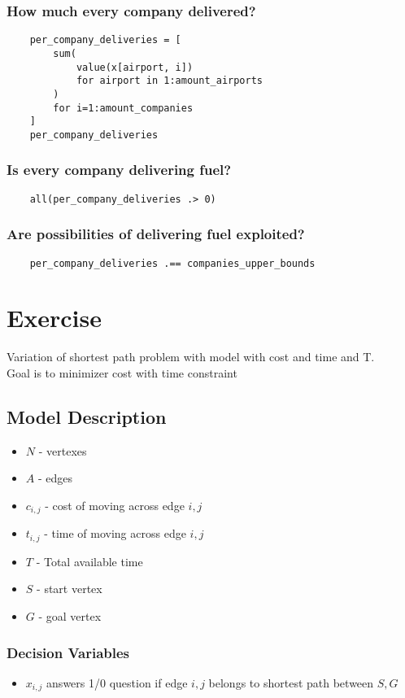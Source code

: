 \documentclass[11pt]{article}
\begin{document}
\subsubsection*{How much every company delivered?}
\begin{verbatim}
    per_company_deliveries = [
        sum(
            value(x[airport, i]) 
            for airport in 1:amount_airports
        ) 
        for i=1:amount_companies
    ]
    per_company_deliveries
\end{verbatim}
\subsubsection*{Is every company delivering fuel?}
\begin{verbatim}
    all(per_company_deliveries .> 0)
\end{verbatim}
\subsubsection*{Are possibilities of delivering fuel exploited?}
\begin{verbatim}
    per_company_deliveries .== companies_upper_bounds
\end{verbatim}
\section{Exercise}
Variation of shortest path problem with  model with cost and time and T. \\
Goal is to minimizer cost with time constraint
\subsection{Model Description}
\begin{itemize}
    \item $N$ - vertexes
    \item $A$ - edges
    \item $c_{i,j}$ - cost of moving across edge ${i,j}$
    \item $t_{i,j}$ - time of moving across edge ${i,j}$
    \item $T$ - Total available time
    \item $S$ - start vertex
    \item $G$ - goal vertex
\end{itemize}
\subsubsection*{Decision Variables}
\begin{itemize}
    \item $x_{i,j}$ answers 1/0 question if edge ${i,j}$ belongs to shortest path between ${S, G}$
\end{itemize}
\end{document}
